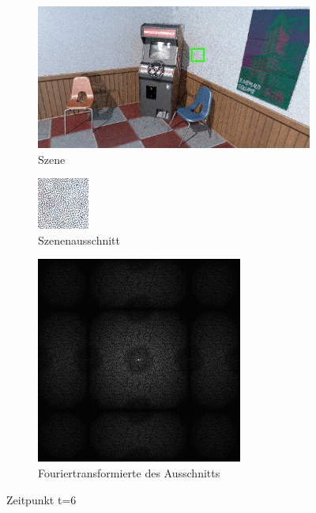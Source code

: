 \begin{figure}[H]
    \begin{subfigure}{\textwidth}   
        \centering \includegraphics[scale=.25]{content/TemporalerAlg/Bilder/Sorting/Szene/Szene6.png}
        \caption{Szene}
        \label{fig:Nur_Sorting_Szene_t6}
    \end{subfigure}
    \begin{subfigure}{0.5\textwidth}
        \centering\includegraphics[width=0.4\linewidth]{content/TemporalerAlg/Bilder/Sorting/Ausschnitte/Ausschnitt6.png} 
        \caption{Szenenausschnitt}
        \label{fig:Nur_Sorting_ausschnitt_t6}
    \end{subfigure}
    \begin{subfigure}{0.5\textwidth}
        \centering\includegraphics[width=0.4\linewidth]{content/TemporalerAlg/Bilder/Sorting/Spektren/Ausschnitt6.png}
        \caption{Fouriertransformierte des Ausschnitts}
        \label{fig:Nur_Sorting_Fouriertransformierte_t6}
    \end{subfigure}
        \caption{Zeitpunkt t=6}
        \label{fig:Nur_Sorting_Verlauf_t6}
\end{figure}

